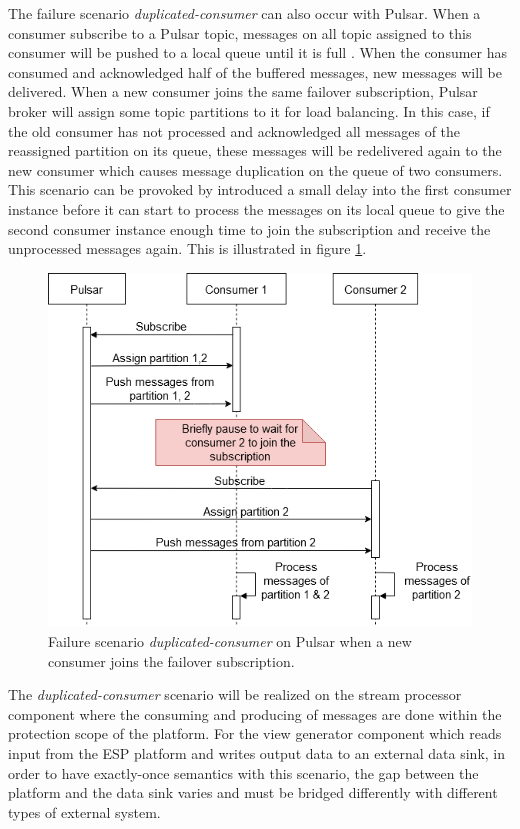 \fi
The failure scenario \emph{duplicated-consumer} can also occur with Pulsar. When a consumer subscribe to a Pulsar topic, messages on all topic assigned to this consumer will be pushed to a local queue until it is full \cite{pulsarbinaryprotocol}. When the consumer has consumed and acknowledged half of the buffered messages, new messages will be delivered. When a new consumer joins the same failover subscription, Pulsar broker will assign some topic partitions to it for load balancing. In this case, if the old consumer has not processed and acknowledged all messages of the reassigned partition on its queue, these messages will be redelivered again to the new consumer which causes message duplication on the queue of two consumers. This scenario can be provoked by introduced a small delay into the first consumer instance before it can start to process the messages on its local queue to give the second consumer instance enough time to join the subscription and receive the unprocessed messages again. This is illustrated in figure \ref{fig:pulsarscenario}.

\begin{figure}[h]
	\centering
	\includegraphics[width=12cm]{images/pulsar-duplicated-scenario.png}
	\caption{Failure scenario \emph{duplicated-consumer} on Pulsar when a new consumer joins the failover subscription.}
	\label{fig:pulsarscenario}
\end{figure}

The \emph{duplicated-consumer} scenario will be realized on the stream processor component where the consuming and producing of messages are done within the protection scope of the platform. For the view generator component which reads input from the ESP platform and writes output data to an external data sink, in order to have exactly-once semantics with this scenario, the gap between the platform and the data sink varies and must be bridged differently with different types of external system.

